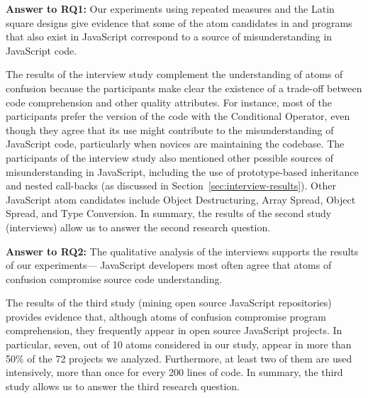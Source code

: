 \begin{mh}
  {\bf Answer to RQ1:} Our experiments using repeated measures and the Latin square designs give evidence that some of the atom candidates in \clang and \cpplang programs that also exist in JavaScript correspond to a source of misunderstanding in
  JavaScript code. 
\end{mh}

The results of the interview study complement the understanding of atoms of confusion because the participants make clear the existence of a trade-off between code comprehension and other quality attributes. For instance, most of the participants prefer the version of the code with the Conditional Operator, even though they agree that its use might contribute to the misunderstanding of JavaScript code, particularly when novices are maintaining the codebase. The participants of the interview study also
mentioned other possible sources of misunderstanding in JavaScript,
including the use of prototype-based inheritance and nested call-backs (as discussed in Section~\ref{sec:interview-results}). Other JavaScript atom candidates include
Object Destructuring, Array Spread, Object Spread, and Type Conversion.
In summary, the results of the second study (interviews) allow
us to answer the second research question.

\begin{mh}
  {\bf Answer to RQ2:} The qualitative analysis of the
  interviews supports the results of our experiments---
  JavaScript developers most often agree that atoms of confusion compromise
  source code understanding. 
\end{mh}


The results of the third study (mining open source
JavaScript repositories) provides evidence that,
although atoms of confusion compromise program
comprehension, they frequently appear in open
source JavaScript projects. In particular,
seven, out of 10 atoms considered
  in our study, appear in more than 50\% of
the 72 projects we analyzed. Furthermore, at least two of them are used intensively, more than once for every 200 lines of code. In summary, the third study
allows us to answer the third research
question.


